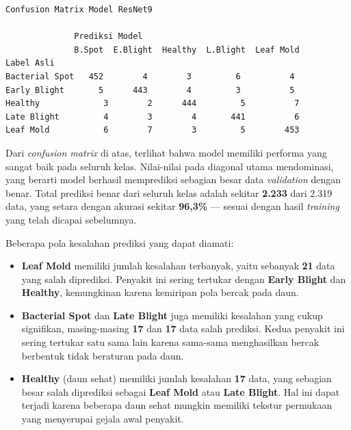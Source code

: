 
\begin{outputcode}[H]
\begin{lstlisting}[language={}]
Confusion Matrix Model ResNet9

              Prediksi Model
              B.Spot  E.Blight  Healthy  L.Blight  Leaf Mold
Label Asli
Bacterial Spot   452        4        3         6          4
Early Blight       5      443        4         3          5
Healthy             3        2      444         5          7
Late Blight         4        3        4       441          6
Leaf Mold           6        7        3         5        453
\end{lstlisting}
\caption{Ilustrasi confusion matrix model ResNet9}
\end{outputcode}

Dari \textit{confusion matrix} di atas, terlihat bahwa model memiliki performa yang sangat baik pada seluruh kelas. Nilai-nilai pada diagonal utama mendominasi, yang berarti model berhasil memprediksi sebagian besar data \textit{validation} dengan benar. Total prediksi benar dari seluruh kelas adalah sekitar \textbf{2.233} dari 2.319 data, yang setara dengan akurasi sekitar \textbf{96,3\%} --- sesuai dengan hasil \textit{training} yang telah dicapai sebelumnya.

Beberapa pola kesalahan prediksi yang dapat diamati:

\begin{itemize}
    \item \textbf{Leaf Mold} memiliki jumlah kesalahan terbanyak, yaitu sebanyak \textbf{21} data yang salah diprediksi. Penyakit ini sering tertukar dengan \textbf{Early Blight} dan \textbf{Healthy}, kemungkinan karena kemiripan pola bercak pada daun.
    \item \textbf{Bacterial Spot} dan \textbf{Late Blight} juga memiliki kesalahan yang cukup signifikan, masing-masing \textbf{17} dan \textbf{17} data salah prediksi. Kedua penyakit ini sering tertukar satu sama lain karena sama-sama menghasilkan bercak berbentuk tidak beraturan pada daun.
    \item \textbf{Healthy} (daun sehat) memiliki jumlah kesalahan \textbf{17} data, yang sebagian besar salah diprediksi sebagai \textbf{Leaf Mold} atau \textbf{Late Blight}. Hal ini dapat terjadi karena beberapa daun sehat mungkin memiliki tekstur permukaan yang menyerupai gejala awal penyakit.
\end{itemize}


